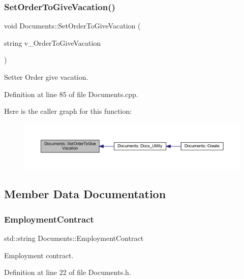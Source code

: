 \subsubsection{\texorpdfstring{Set\+Order\+To\+Give\+Vacation()}{SetOrderToGiveVacation()}}
{\footnotesize\ttfamily void Documents\+::\+Set\+Order\+To\+Give\+Vacation (\begin{DoxyParamCaption}\item[{string}]{v\+\_\+\+Order\+To\+Give\+Vacation }\end{DoxyParamCaption})}



Setter Order give vacation. 



Definition at line 85 of file Documents.\+cpp.

Here is the caller graph for this function\+:
\nopagebreak
\begin{figure}[H]
\begin{center}
\leavevmode
\includegraphics[width=350pt]{class_documents_a484f3e195b0ab7383ef09278cd95907f_icgraph}
\end{center}
\end{figure}


\subsection{Member Data Documentation}
\mbox{\label{class_documents_a28e850b0505533696603105c57450770}} 
\subsubsection{\texorpdfstring{Employment\+Contract}{EmploymentContract}}
{\footnotesize\ttfamily std\+::string Documents\+::\+Employment\+Contract}



Employment contract. 



Definition at line 22 of file Documents.\+h.

